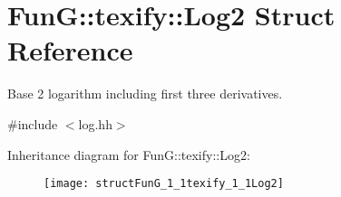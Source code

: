 \hypertarget{structFunG_1_1texify_1_1Log2}{\section{Fun\-G\-:\-:texify\-:\-:Log2 Struct Reference}
\label{structFunG_1_1texify_1_1Log2}
}


Base 2 logarithm including first three derivatives.  




{\ttfamily \#include $<$log.\-hh$>$}

Inheritance diagram for Fun\-G\-:\-:texify\-:\-:Log2\-:\begin{figure}[H]
\begin{center}
\leavevmode
\texttt{[image: structFunG\_1\_1texify\_1\_1Log2]}
\end{center}
\end{figure}
